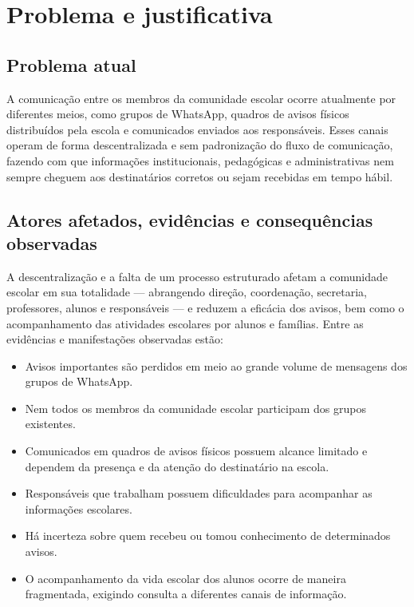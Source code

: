\documentclass[a4paper,12pt]{report}
\begin{document}
\section{Problema e justificativa}

\subsection{Problema atual}
A comunicação entre os membros da comunidade escolar ocorre atualmente por diferentes meios, como grupos de WhatsApp, quadros de avisos físicos distribuídos pela escola e comunicados enviados aos responsáveis. Esses canais operam de forma descentralizada e sem padronização do fluxo de comunicação, fazendo com que informações institucionais, pedagógicas e administrativas nem sempre cheguem aos destinatários corretos ou sejam recebidas em tempo hábil.

\subsection{Atores afetados, evidências e consequências observadas}
A descentralização e a falta de um processo estruturado afetam a comunidade escolar em sua totalidade — abrangendo direção, coordenação, secretaria, professores, alunos e responsáveis — e reduzem a eficácia dos avisos, bem como o acompanhamento das atividades escolares por alunos e famílias. Entre as evidências e manifestações observadas estão:

\begin{itemize}
    \item Avisos importantes são perdidos em meio ao grande volume de mensagens dos grupos de WhatsApp.
    \item Nem todos os membros da comunidade escolar participam dos grupos existentes.
    \item Comunicados em quadros de avisos físicos possuem alcance limitado e dependem da presença e da atenção do destinatário na escola.
    \item Responsáveis que trabalham possuem dificuldades para acompanhar as informações escolares.
    \item Há incerteza sobre quem recebeu ou tomou conhecimento de determinados avisos.
    \item O acompanhamento da vida escolar dos alunos ocorre de maneira fragmentada, exigindo consulta a diferentes canais de informação.
\end{itemize}
\end{document}
